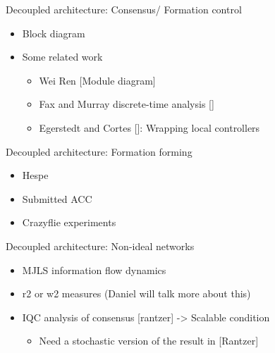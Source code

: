 \begin{frame}{Decoupled architecture: Consensus/ Formation control}	
	\begin{itemize}
		\item Block diagram
		\item Some related work
		\begin{itemize}
			\item Wei Ren [Module diagram]
			\item Fax and Murray discrete-time analysis []
			\item Egerstedt and Cortes []: Wrapping local controllers
		\end{itemize}
	\end{itemize}
\end{frame}
\begin{frame}{Decoupled architecture: Formation forming}	
	\begin{itemize}
		\item Hespe
		\item Submitted ACC
		\item Crazyflie experiments
	\end{itemize}
\end{frame}
\begin{frame}{Decoupled architecture: Non-ideal networks}	
	\begin{itemize}
		\item MJLS information flow dynamics
		\item r2 or w2 measures (Daniel will talk more about this)
		\item IQC analysis of consensus [rantzer] -> Scalable condition
		\begin{itemize}
			\item Need a stochastic version of the result in [Rantzer]
		\end{itemize}
	\end{itemize}
\end{frame}